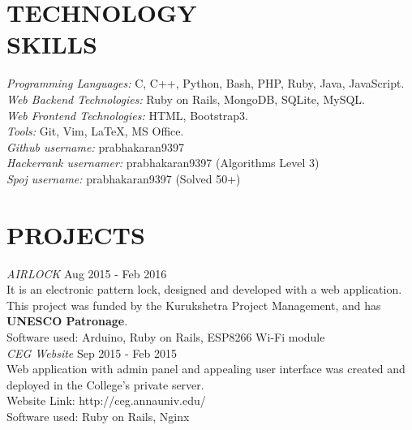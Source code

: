 \documentclass[margin, 10pt]{res} %
\begin{document}
\begin{resume}

\section{TECHNOLOGY \\ SKILLS} 

{\sl Programming Languages:} C, C++, Python, Bash, PHP, Ruby, Java, JavaScript. \\
{\sl Web Backend Technologies:} Ruby on Rails, MongoDB, SQLite, MySQL. \\
{\sl Web Frontend Technologies:} HTML, Bootstrap3. \\
{\sl Tools:} Git, Vim, LaTeX, MS Office. \\
{\sl Github username:} prabhakaran9397 \\
{\sl Hackerrank usernamer:} prabhakaran9397 (Algorithms Level 3) \\
{\sl Spoj username:} prabhakaran9397 (Solved 50+) \\
 
 
\section{PROJECTS}

{\sl AIRLOCK} \hfill Aug 2015 - Feb 2016 \\
It is an electronic pattern lock, designed and developed with a web application. This project was funded by the Kurukshetra Project Management, and has \textbf{UNESCO Patronage}.\\ 
Software used: Arduino, Ruby on Rails, ESP8266 Wi-Fi module \\

{\sl CEG Website} \hfill Sep 2015 - Feb 2015 \\
Web application with admin panel and appealing user interface was created and deployed in the College's private server. \\
Website Link: http://ceg.annauniv.edu/ \\
Software used: Ruby on Rails, Nginx \\
 

\end{resume}
\end{document}
